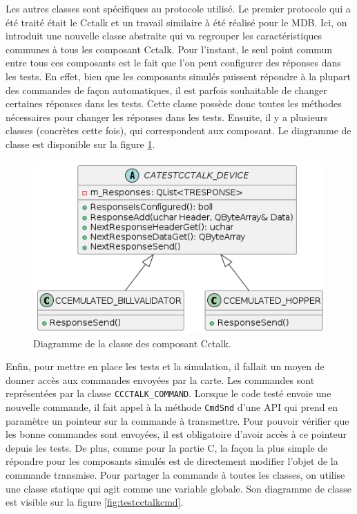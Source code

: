 \documentclass[a4paper]{article}
\begin{document}
Les autres classes sont spécifiques au protocole utilisé. Le premier protocole
qui a été traité était le Cctalk et un travail similaire à été réalisé pour le
MDB. Ici, on introduit une nouvelle classe abstraite qui va regrouper les
caractéristiques communes à tous les composant Cctalk. Pour l'instant, le seul
point commun entre tous ces composants est le fait que l'on peut configurer des
réponses dans les tests. En effet, bien que les composants simulés puissent
répondre à la plupart des commandes de façon automatiques, il est parfois
souhaitable de changer certaines réponses dans les tests. Cette classe possède
donc toutes les méthodes nécessaires pour changer les réponses dans les tests.
Ensuite, il y a plusieurs classes (concrètes cette fois), qui correspondent aux
composant. Le diagramme de classe est disponible sur la figure \ref{fig:simucctalk}.

\begin{figure}[h!]
  \begin{center}
  \includegraphics[scale=0.5]{./graphs/simulation_cctalk.png}
    \caption{Diagramme de la classe des composant Cctalk.}
    \label{fig:simucctalk}
  \end{center}
\end{figure}

Enfin, pour mettre en place les tests et la simulation, il fallait un moyen de
donner accès aux commandes envoyées par la carte. Les commandes sont
représentées par la classe \verb|CCCTALK_COMMAND|. Lorsque le code testé envoie
une nouvelle commande, il fait appel à la méthode \verb|CmdSnd| d'une API qui
prend en paramètre un pointeur sur la commande à transmettre. Pour pouvoir
vérifier que les bonne commandes sont envoyées, il est obligatoire d'avoir accès
à ce pointeur depuis les tests. De plus, comme pour la partie C, la façon la
plus simple de répondre pour les composants simulés est de directement modifier
l'objet de la commande transmise. Pour partager la commande à toutes les
classes, on utilise une classe statique qui agit comme une variable globale. Son
diagramme de classe est visible sur la figure \ref{fig:testcctalkcmd}.
\end{document}
